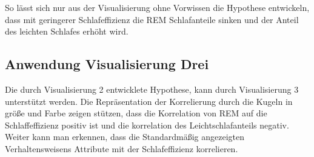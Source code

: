 \documentclass[usegeometry=true]{scrartcl}
\begin{document}
So lässt sich nur aus der Visualisierung ohne Vorwissen die Hypothese entwickeln, dass mit geringerer Schlafeffizienz die REM Schlafanteile sinken und der Anteil des leichten Schlafes erhöht wird.

\subsection{Anwendung Visualisierung Drei}

Die durch Visualisierung 2 entwicklete Hypothese, kann durch Visualisierung 3 unterstützt werden. 
Die Repräsentation der Korrelierung durch die Kugeln  in größe und Farbe zeigen stützen, dass die Korrelation von REM auf die Schlaffeffizienz positiv ist und die korrelation des Leichtschlafanteils negativ. 
Weiter kann man erkennen, dass die Standardmäßig angezeigten Verhaltensweisens Attribute mit der Schlafeffizienz korrelieren. 
\end{document}

